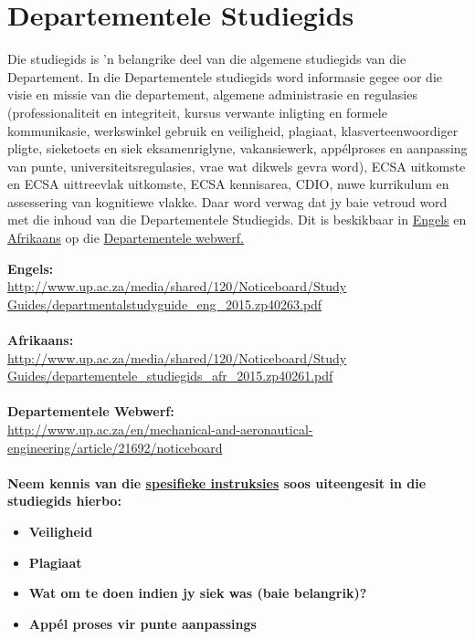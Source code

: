 \section{Departementele Studiegids}\label{sec:department}
    Die studiegids is 'n belangrike deel van die algemene studiegids van die
    Departement. In die Departementele studiegids word informasie gegee oor die
    visie en missie van die departement, algemene administrasie en regulasies
    (professionaliteit en integriteit, kursus verwante inligting en formele
    kommunikasie, werkswinkel gebruik en veiligheid, plagiaat,
    klasverteenwoordiger pligte, sieketoets en siek eksamenriglyne,
    vakansiewerk, app\'{e}lproses en aanpassing van punte,
    universiteitsregulasies, vrae wat dikwels gevra word), ECSA uitkomste en
    ECSA uittreevlak uitkomste, ECSA kennisarea, CDIO, nuwe kurrikulum en
    assessering van kognitiewe vlakke.  Daar word verwag dat jy baie vetroud
    word met die inhoud van die Departementele Studiegids.  Dit is beskikbaar
    in
    \href{http://www.up.ac.za/media/shared/120/Noticeboard/Study Guides/departmentalstudyguide_eng_2015.zp40263.pdf}{Engels}
    en
    \href{http://www.up.ac.za/media/shared/120/Noticeboard/Study Guides/departementele_studiegids_afr_2015.zp40261.pdf}{Afrikaans}
    op die
    \href{http://www.up.ac.za/en/mechanical-and-aeronautical-engineering/article/21692/noticeboard}{Departementele webwerf.}

    \noindent
    \textbf{Engels:} \\
    \url{http://www.up.ac.za/media/shared/120/Noticeboard/Study Guides/departmentalstudyguide_eng_2015.zp40263.pdf} \\~\\
    \textbf{Afrikaans:} \\
    \url{http://www.up.ac.za/media/shared/120/Noticeboard/Study Guides/departementele_studiegids_afr_2015.zp40261.pdf} \\~\\
    \textbf{Departementele Webwerf:} \\
    \url{http://www.up.ac.za/en/mechanical-and-aeronautical-engineering/article/21692/noticeboard} \\~\\

    \noindent
    \textbf{Neem kennis van die \uline{spesifieke instruksies} soos uiteengesit
    in die studiegids hierbo:}
    \begin{itemize}
        \item \textbf{Veiligheid}
        \item \textbf{Plagiaat}
        \item \textbf{Wat om te doen indien jy siek was (baie belangrik)?}
        \item \textbf{App\'el proses vir punte aanpassings}
    \end{itemize}
